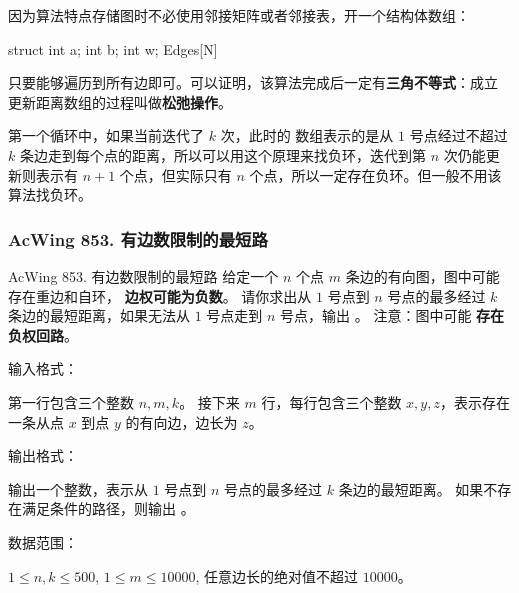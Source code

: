 因为算法特点存储图时不必使用邻接矩阵或者邻接表，开一个结构体数组：

\begin{mycpponecol}[边集]
    struct {
        int a;
        int b;
        int w;
    } Edges[N]
\end{mycpponecol}

只要能够遍历到所有边即可。可以证明，该算法完成后一定有\textbf{三角不等式}：成立
更新距离数组的过程叫做\textbf{松弛操作}。

第一个循环中，如果当前迭代了 $k$ 次，此时的  数组表示的是从 $1$ 号点经过不超过 $k$ 条边走到每个点的距离，所以可以用这个原理来找负环，迭代到第 $n$ 次仍能更新则表示有 $n+1$ 个点，但实际只有 $n$ 个点，所以一定存在负环。但一般不用该算法找负环。

\subsubsection{AcWing 853. 有边数限制的最短路}
\begin{titledbox}{AcWing 853. 有边数限制的最短路}
    给定一个 $n$ 个点 $m$ 条边的有向图，图中可能存在重边和自环， \textbf{边权可能为负数}。 请你求出从 $1$ 号点到 $n$ 号点的最多经过 $k$ 条边的最短距离，如果无法从 $1$ 号点走到 $n$ 号点，输出 。 注意：图中可能 \textbf{存在负权回路}。

    输入格式：

    第一行包含三个整数 $n,m,k$。 接下来 $m$ 行，每行包含三个整数 $x,y,z$，表示存在一条从点 $x$ 到点 $y$ 的有向边，边长为 $z$。

    输出格式：

    输出一个整数，表示从 $1$ 号点到 $n$ 号点的最多经过 $k$ 条边的最短距离。 如果不存在满足条件的路径，则输出 。

    数据范围：

    $1 \le n,k \le 500$, $1 \le m \le 10000$, 任意边长的绝对值不超过 $10000$。

    \begin{inputblock}
         \\
         \\
         \\
    \end{inputblock}
    \begin{outputblock}
    \end{outputblock}
\end{titledbox}

